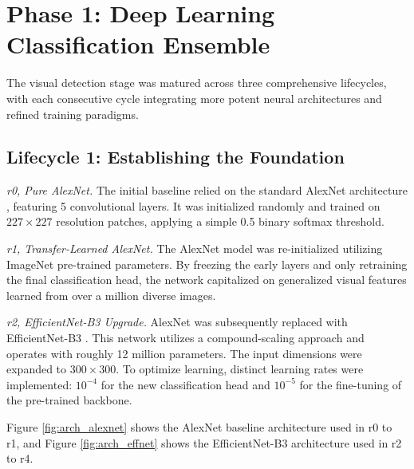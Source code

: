 \documentclass[12pt,a4paper]{report}
\begin{document}
\section{Phase 1: Deep Learning Classification Ensemble}\label{sec:phase1_arch}

The visual detection stage was matured across three comprehensive lifecycles, with each consecutive cycle integrating more potent neural architectures and refined training paradigms.

\subsection{Lifecycle 1: Establishing the Foundation}
\textit{r0, Pure AlexNet.} The initial baseline relied on the standard AlexNet architecture \cite{krizhevsky2012alexnet}, featuring 5 convolutional layers. It was initialized randomly and trained on $227\times227$ resolution patches, applying a simple 0.5 binary softmax threshold.

\textit{r1, Transfer-Learned AlexNet.} The AlexNet model was re-initialized utilizing ImageNet \cite{deng2009imagenet} pre-trained parameters. By freezing the early layers and only retraining the final classification head, the network capitalized on generalized visual features learned from over a million diverse images.

\textit{r2, EfficientNet-B3 Upgrade.} AlexNet was subsequently replaced with EfficientNet-B3 \cite{tan2019efficientnet}. This network utilizes a compound-scaling approach and operates with roughly 12 million parameters. The input dimensions were expanded to $300\times300$. To optimize learning, distinct learning rates were implemented: $10^{-4}$ for the new classification head and $10^{-5}$ for the fine-tuning of the pre-trained backbone.

Figure \ref{fig:arch_alexnet} shows the AlexNet baseline architecture used in r0 to r1, and Figure \ref{fig:arch_effnet} shows the EfficientNet-B3 architecture used in r2 to r4.
\end{document}
